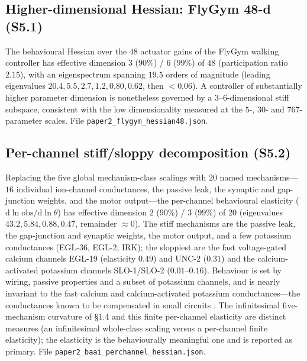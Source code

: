 \documentclass[11pt]{article}
\begin{document}
\subsection{Higher-dimensional Hessian: FlyGym 48-d (S5.1)}
The behavioural Hessian over the $48$ actuator gains of the FlyGym walking controller has effective dimension $3$ ($90\%$) / $6$ ($99\%$) of $48$ (participation ratio $2.15$), with an eigenspectrum spanning $19.5$ orders of magnitude (leading eigenvalues $20.4, 5.5, 2.7, 1.2, 0.80, 0.62$, then $<\!0.06$). A controller of substantially higher parameter dimension is nonetheless governed by a $3$--$6$-dimensional stiff subspace, consistent with the low dimensionality measured at the $5$-, $30$- and $767$-parameter scales. File \texttt{paper2\_flygym\_hessian48.json}.

\subsection{Per-channel stiff/sloppy decomposition (S5.2)}
Replacing the five global mechanism-class scalings with $20$ named mechanisms---$16$ individual ion-channel conductances, the passive leak, the synaptic and gap-junction weights, and the motor output---the per-channel behavioural elasticity ($\mathrm{d}\ln\mathrm{obs}/\mathrm{d}\ln\theta$) has effective dimension $2$ ($90\%$) / $3$ ($99\%$) of $20$ (eigenvalues $43.2, 5.84, 0.88, 0.47$, remainder $\approx0$). The stiff mechanisms are the passive leak, the gap-junction and synaptic weights, the motor output, and a few potassium conductances (EGL-36, EGL-2, IRK); the sloppiest are the fast voltage-gated calcium channels EGL-19 (elasticity $0.49$) and UNC-2 ($0.31$) and the calcium-activated potassium channels SLO-1/SLO-2 ($0.01$--$0.16$). Behaviour is set by wiring, passive properties and a subset of potassium channels, and is nearly invariant to the fast calcium and calcium-activated potassium conductances---the conductances known to be compensated in small circuits \citep{marder2006variability}. The infinitesimal five-mechanism curvature of \S1.4 and this finite per-channel elasticity are distinct measures (an infinitesimal whole-class scaling versus a per-channel finite elasticity); the elasticity is the behaviourally meaningful one and is reported as primary. File \texttt{paper2\_baai\_perchannel\_hessian.json}.
\end{document}
